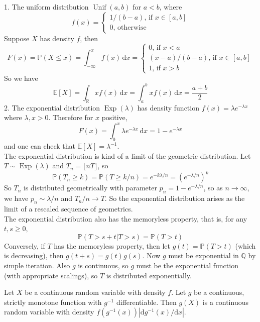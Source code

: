\begin{example}
    1. The uniform distribution $\operatorname{Unif}(a,b)$ for $a<b$, where
    $$f(x)=\begin{cases}
        1/(b-a)\text{, if $x\in [a,b]$}\\
        0\text{, otherwise}
    \end{cases}$$
    Suppose $X$ has density $f$, then
    $$F(x)=\mathbb P(X\le x)=\int_{-\infty}^xf(x)\,\mathrm dx=\begin{cases}
        0\text{, if $x<a$}\\
        (x-a)/(b-a)\text{, if $x\in [a,b]$}\\
        1\text{, if $x>b$}
    \end{cases}$$
    So we have
    $$\mathbb E[X]=\int_{\mathbb R}xf(x)\,\mathrm dx=\int_a^bxf(x)\,\mathrm dx=\frac{a+b}{2}$$
    2. The exponential distribution $\operatorname{Exp}(\lambda)$ has density function $f(x)=\lambda e^{-\lambda x}$ where $\lambda,x>0$.
    Therefore for $x$ positive,
    $$F(x)=\int_0^x\lambda e^{-\lambda x}\,\mathrm dx=1-e^{-\lambda x}$$
    and one can check that $\mathbb E[X]=\lambda^{-1}$.\\
    The exponential distribution is kind of a limit of the geometric distribution.
    Let $T\sim\operatorname{Exp}(\lambda)$ and $T_n=\lfloor nT\rfloor$, so
    $$\mathbb P(T_n\ge k)=\mathbb P(T\ge k/n)=e^{-k\lambda/n}=(e^{-\lambda/n})^k$$
    So $T_n$ is distributed geometrically with parameter $p_n=1-e^{-\lambda/n}$, so as $n\to\infty$, we have $p_n\sim \lambda/n$ and $T_n/n\to T$.
    So the exponential distribution arises as the limit of a rescaled sequence of geometrics.\\
    The exponential distribution also has the memoryless property, that is, for any $t,s\ge 0$,
    $$\mathbb P(T>s+t|T>s)=\mathbb P(T>t)$$
    Conversely, if $T$ has the memoryless property, then let $g(t)=\mathbb P(T>t)$ (which is decreasing), then $g(t+s)=g(t)g(s)$.
    Now $g$ must be exponential in $\mathbb Q$ by simple iteration.
    Also $g$ is continuous, so $g$ must be the exponential function (with appropriate scalings), so $T$ is distributed exponentially.
\end{example}
\begin{theorem}
    Let $X$ be a continuous random variable with density $f$.
    Let $g$ be a continuous, strictly monotone function with $g^{-1}$ differentiable.
    Then $g(X)$ is a continuous random variable with density $f(g^{-1}(x))|\mathrm dg^{-1}(x)/\mathrm dx|$.
\end{theorem}
